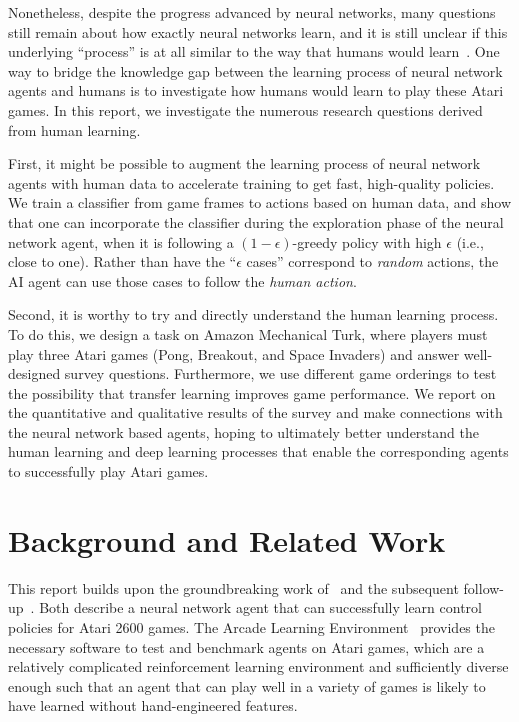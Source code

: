 \documentclass[letterpaper, 10 pt, conference]{ieeeconf}  %
\begin{document}
Nonetheless, despite the progress advanced by neural networks, many questions still remain about how
exactly neural networks learn, and it is still unclear if this underlying ``process'' is at all
similar to the way that humans would learn~\cite{szegedy2013intriguing,nguyen2015deep}.  One way to
bridge the knowledge gap between the learning process of neural network agents and humans is to
investigate how humans would learn to play these Atari games. In this report, we investigate the
numerous research questions derived from human learning.

First, it might be possible to augment the learning process of neural network agents with human data
to accelerate training to get fast, high-quality policies. We train a classifier from game frames to
actions based on human data, and show that one can incorporate the classifier during the exploration
phase of the neural network agent, when it is following a $(1-\epsilon)$-greedy policy with high
$\epsilon$ (i.e., close to one). Rather than have the ``$\epsilon$ cases'' correspond to
\emph{random} actions, the AI agent can use those cases to follow the \emph{human action}.

Second, it is worthy to try and directly understand the human learning process. To do this, we
design a task on Amazon Mechanical Turk, where players must play three Atari games (Pong, Breakout,
and Space Invaders) and answer well-designed survey questions. Furthermore, we use different game
orderings to test the possibility that transfer learning improves game performance.  We report on
the quantitative and qualitative results of the survey and make connections with the neural network
based agents, hoping to ultimately better understand the human learning and deep learning processes
that enable the corresponding agents to successfully play Atari games.


\section{Background and Related Work}\label{sec:related_work}

This report builds upon the groundbreaking work of~\cite{mnih-atari-2013} and the subsequent
follow-up~\cite{mnih-dqn-2015}. Both describe a neural network agent that can successfully
learn control policies for Atari 2600 games. The Arcade Learning
Environment~\cite{bellemare13arcade} provides the necessary software to test and benchmark agents on
Atari games, which are a relatively complicated reinforcement learning environment and sufficiently
diverse enough such that an agent that can play well in a variety of games is likely to have learned
without hand-engineered features.
\end{document}
